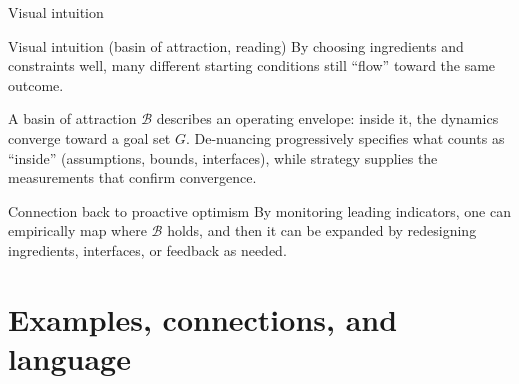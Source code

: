 \documentclass[presentation,aspectratio=169,11pt]{beamer}
\begin{document}
\begin{frame}{Visual intuition}
\centering
{}
\end{frame}

\begin{frame}{Visual intuition (basin of attraction, reading)}
\justifying
\small
By choosing ingredients and constraints well, many different starting conditions still ``flow'' toward the same outcome.

\vspace{0.6em}
A basin of attraction $\mathcal{B}$ describes an operating envelope: inside it, the dynamics converge toward a goal set $G$. De-nuancing progressively specifies what counts as ``inside'' (assumptions, bounds, interfaces), while strategy supplies the measurements that confirm convergence.

\vspace{0.8em}
\begin{block}{Connection back to proactive optimism}
\justifying
By monitoring leading indicators, one can empirically map where $\mathcal{B}$ holds, and then it can be expanded by redesigning ingredients, interfaces, or feedback as needed.
\end{block}
\end{frame}


\section{Examples, connections, and language}
\end{document}
